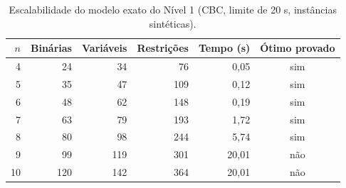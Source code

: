 \begin{table}[htbp]
\centering
\small
\caption{Escalabilidade do modelo exato do Nível 1 (CBC, limite de 20 s, instâncias sintéticas).}
\label{tab:escalabilidade}
\begin{tabular}{rrrrrc}
\toprule
$n$ & Binárias & Variáveis & Restrições & Tempo (s) & Ótimo provado \\
\midrule
4 & 24 & 34 & 76 & 0,05 & sim \\
5 & 35 & 47 & 109 & 0,12 & sim \\
6 & 48 & 62 & 148 & 0,19 & sim \\
7 & 63 & 79 & 193 & 1,72 & sim \\
8 & 80 & 98 & 244 & 5,74 & sim \\
9 & 99 & 119 & 301 & 20,01 & não \\
10 & 120 & 142 & 364 & 20,01 & não \\
\bottomrule
\end{tabular}
\end{table}
